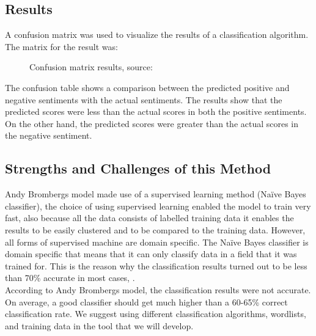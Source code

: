 \clearpage
\subsection{Results}

A confusion matrix was used to visualize the results of a classification algorithm. The matrix for
the result was:

\begin{figure}[h]
  \centering
  \caption[Confusion matrix results]%
  {Confusion matrix results, source: \cite{ref31}}
  \label{fig:ALAP:sm3}
\end{figure}


The confusion table shows a comparison between the predicted positive and negative sentiments
with the actual sentiments. The results show that the predicted scores were less than the actual
scores in both the positive sentiments. On the other hand, the predicted scores were greater than
the actual scores in the negative sentiment.

\subsection{Strengths and Challenges of this Method}
Andy Bromberg\textquotesingle s model made use of a supervised learning method (Naïve Bayes classifier), the
choice of using supervised learning enabled the model to train very fast, also because all the data
consists of labelled training data it enables the results to be easily clustered and to be compared to
the training data. However, all forms of supervised machine are domain specific. The Naïve Bayes
classifier is domain specific that means that it can only classify data in a field that it was trained
for. This is the reason why the classification results turned out to be less than 70\% accurate in most
cases, \cite{ref31}.
\leavevmode\\
According to Andy Bromberg\textquotesingle s model, the classification results were not accurate. On average, a
good classifier should get much higher than a 60-65\% correct classification rate. We suggest using
different classification algorithms, wordlists, and training data in the tool that we will develop.



